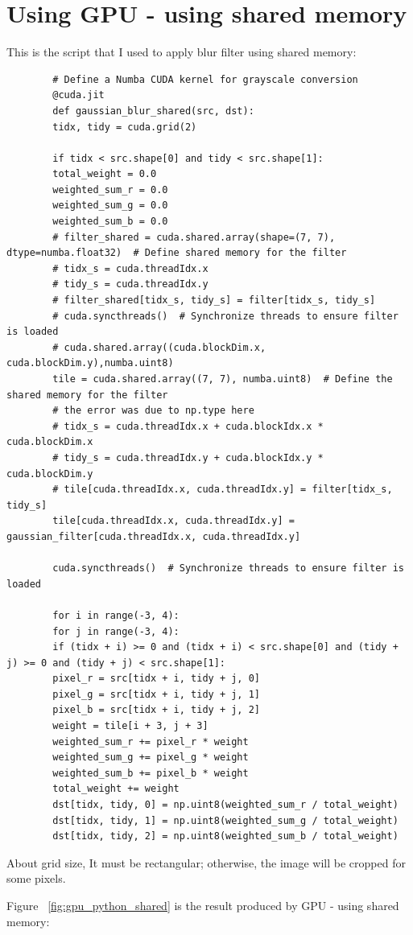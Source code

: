 \documentclass{article}
\begin{document}
	\section{Using GPU - using shared memory}
	This is the script that I used to apply blur filter using shared memory:
	\begin{verbatim}
		# Define a Numba CUDA kernel for grayscale conversion
		@cuda.jit
		def gaussian_blur_shared(src, dst):
		tidx, tidy = cuda.grid(2)
		
		if tidx < src.shape[0] and tidy < src.shape[1]:
		total_weight = 0.0
		weighted_sum_r = 0.0
		weighted_sum_g = 0.0
		weighted_sum_b = 0.0
		# filter_shared = cuda.shared.array(shape=(7, 7), dtype=numba.float32)  # Define shared memory for the filter
		# tidx_s = cuda.threadIdx.x
		# tidy_s = cuda.threadIdx.y
		# filter_shared[tidx_s, tidy_s] = filter[tidx_s, tidy_s]
		# cuda.syncthreads()  # Synchronize threads to ensure filter is loaded
		# cuda.shared.array((cuda.blockDim.x, cuda.blockDim.y),numba.uint8)
		tile = cuda.shared.array((7, 7), numba.uint8)  # Define the shared memory for the filter
		# the error was due to np.type here
		# tidx_s = cuda.threadIdx.x + cuda.blockIdx.x * cuda.blockDim.x
		# tidy_s = cuda.threadIdx.y + cuda.blockIdx.y * cuda.blockDim.y
		# tile[cuda.threadIdx.x, cuda.threadIdx.y] = filter[tidx_s, tidy_s]
		tile[cuda.threadIdx.x, cuda.threadIdx.y] = gaussian_filter[cuda.threadIdx.x, cuda.threadIdx.y]
		
		cuda.syncthreads()  # Synchronize threads to ensure filter is loaded
		
		for i in range(-3, 4):
		for j in range(-3, 4):
		if (tidx + i) >= 0 and (tidx + i) < src.shape[0] and (tidy + j) >= 0 and (tidy + j) < src.shape[1]:
		pixel_r = src[tidx + i, tidy + j, 0]
		pixel_g = src[tidx + i, tidy + j, 1]
		pixel_b = src[tidx + i, tidy + j, 2]
		weight = tile[i + 3, j + 3]
		weighted_sum_r += pixel_r * weight
		weighted_sum_g += pixel_g * weight
		weighted_sum_b += pixel_b * weight
		total_weight += weight
		dst[tidx, tidy, 0] = np.uint8(weighted_sum_r / total_weight)
		dst[tidx, tidy, 1] = np.uint8(weighted_sum_g / total_weight)
		dst[tidx, tidy, 2] = np.uint8(weighted_sum_b / total_weight)
	\end{verbatim}
	
	About grid size, It must be rectangular; otherwise, the image will be cropped for some pixels.
	
	Figure ~\ref{fig:gpu_python_shared} is the result produced by GPU - using shared memory:
	
\end{document}
